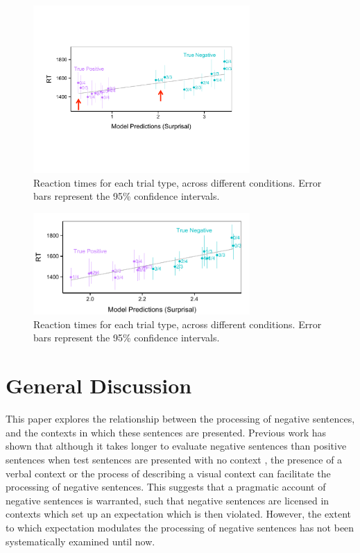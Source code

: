 \documentclass[10pt,letterpaper]{article}
\begin{document}
\begin{figure}
\begin{center} 
\includegraphics[width=3.25in]{figures/model1_comparison.pdf}
\caption{\label{fig:addition_subs} Reaction times for each trial type, across different conditions.  Error bars represent the 95\% confidence intervals.}
\end{center} 
\end{figure}

\begin{figure}
\begin{center} 
\includegraphics[width=3.25in]{figures/model2_comparison.pdf}
\caption{\label{fig:addition_subs} Reaction times for each trial type, across different conditions.  Error bars represent the 95\% confidence intervals.}
\end{center} 
\end{figure}


\section{General Discussion}

This paper explores the relationship between the processing of negative sentences, and the contexts in which these sentences are presented.  Previous work has shown that although it takes longer to evaluate negative sentences than positive sentences when test sentences are presented with no context \cite{carpenter1975, just1971, just1976, hclark1972}, the presence of a verbal context \cite{dale2011, glenberg1999, ludtke2006} or the process of describing a visual context \cite{wason1965} can facilitate the processing of negative sentences.  This suggests that a pragmatic account of negative sentences is warranted, such that negative sentences are licensed in contexts which set up an expectation which is then violated.  However, the extent to which expectation modulates the processing of negative sentences has not been systematically examined until now.  
\end{document}
